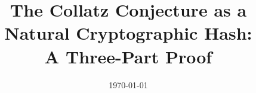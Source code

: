 \documentclass[12pt]{article}
\title{The Collatz Conjecture as a Natural Cryptographic Hash:\\A Three-Part Proof}
\author{} %
\date{\today}
\theoremstyle{plain}
\theoremstyle{definition}
\begin{document}
\maketitle

\begin{abstract}

\end{abstract}

\tableofcontents
\newpage











\appendix




\end{document}
